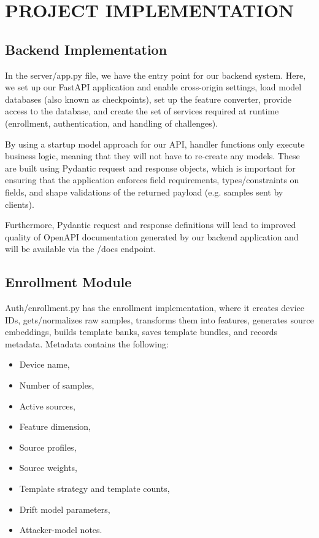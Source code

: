 \chapter{\MakeUppercase{Project implementation}}
\justifying
\section{Backend Implementation}
In the server/app.py file, we have the entry point for our backend system. Here, we set up our FastAPI application and enable cross-origin settings, load model databases (also known as checkpoints), set up the feature converter, provide access to the database, and create the set of services required at runtime (enrollment, authentication, and handling of challenges).

By using a startup model approach for our API, handler functions only execute business logic, meaning that they will not have to re-create any models. These are built using Pydantic request and response objects, which is important for ensuring that the application enforces field requirements, types/constraints on fields, and shape validations of the returned payload (e.g. samples sent by clients).

Furthermore, Pydantic request and response definitions will lead to improved quality of OpenAPI documentation generated by our backend application and will be available via the /docs endpoint.

\section{Enrollment Module}
Auth/enrollment.py has the enrollment implementation, where it creates device IDs, gets/normalizes raw samples, transforms them into features, generates source embeddings, builds template banks, saves template bundles, and records metadata. Metadata contains the following:
\begin{itemize}
	\item Device name,
	\item Number of samples,
	\item Active sources,
	\item Feature dimension,
	\item Source profiles,
	\item Source weights,
	\item Template strategy and template counts,
	\item Drift model parameters,
	\item Attacker-model notes.
\end{itemize}

